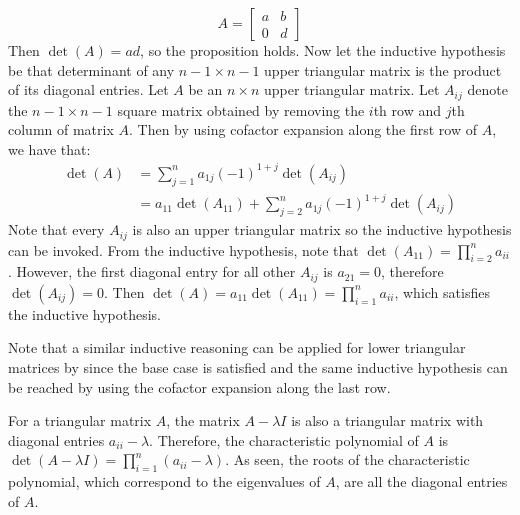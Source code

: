 \documentclass[letterpaper,12pt]{article}
\theoremstyle{definition}
\begin{document}
\begin{enumerate}
    \[
      A =
      \begin{bmatrix}
        a & b \\
        0 & d
      \end{bmatrix}
    \]
    Then $\det(A) = ad$, so the proposition holds.
    Now let the inductive hypothesis be that determinant of any $n-1\times n-1$ upper triangular matrix is the product of its diagonal entries. Let $A$ be an $n\times n$ upper triangular matrix. Let $A_{ij}$ denote the $n-1 \times n-1$ square matrix obtained by removing the $i$th row and $j$th column of matrix $A$. Then by using cofactor expansion along the first row of $A$, we have that:
      \begin{align*}
        \det(A) &= \sum_{j=1}^{n}a_{1j}(-1)^{1+j}\det(A_{ij}) \\
        &= a_{11}\det(A_{11}) + \sum_{j=2}^{n}a_{1j}(-1)^{1+j}\det(A_{ij})
      \end{align*}
     Note that every $A_{ij}$ is also an upper triangular matrix so the inductive hypothesis can be invoked. From the inductive hypothesis, note that $\det(A_{11})=\prod_{i=2}^n a_{ii}$. However, the first diagonal entry for all other $A_{ij}$ is $a_{21} = 0$, therefore $\det(A_{ij})=0$. Then $\det(A) = a_{11}\det(A_{11}) = \prod_{i=1}^n a_{ii}$, which satisfies the inductive hypothesis.

     Note that a similar inductive reasoning can be applied for lower triangular matrices by since the base case is satisfied and the same inductive hypothesis can be reached by using the cofactor expansion along the last row.

     For a triangular matrix $A$, the matrix $A-\lambda I$ is also a triangular matrix with diagonal entries $a_{ii}-\lambda$. Therefore, the characteristic polynomial of $A$ is $\det(A-\lambda I) = \prod_{i=1}^n (a_{ii}-\lambda)$. As seen, the roots of the characteristic polynomial, which correspond to the eigenvalues of $A$, are all the diagonal entries of $A$.


\end{enumerate}
\end{document}

